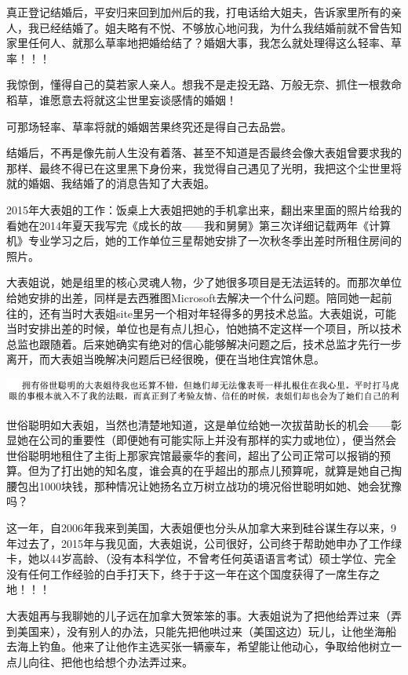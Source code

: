 \documentclass[9pt, b5paper]{article}
\begin{document}
真正登记结婚后，平安归来回到加州后的我，打电话给大姐夫，告诉家里所有的亲人，我已经结婚了。姐夫略有不悦、不够放心地问我，为什么我结婚前就不曾告知家里任何人、就那么草率地把婚给结了？婚姻大事，我怎么就处理得这么轻率、草率！！！

我惊倒，懂得自己的莫若家人亲人。想我不是走投无路、万般无奈、抓住一根救命稻草，谁愿意去将就这尘世里妄谈感情的婚姻！

可那场轻率、草率将就的婚姻苦果终究还是得自己去品尝。

结婚后，不再是像先前人生没有着落、甚至不知道是否最终会像大表姐曾要求我的那样、最终不得已在这里黑下身份来，我觉得自己遇见了光明，我把这个尘世里将就的婚姻、我结婚了的消息告知了大表姐。

2015年大表姐的工作：饭桌上大表姐把她的手机拿出来，翻出来里面的照片给我的看她在2014年夏天我写完《成长的故——我和舅舅》第三次详细记载两年《计算机》专业学习之后，她的工作单位三星帮她安排了一次秋冬季出差时所租住房间的照片。

大表姐说，她是组里的核心灵魂人物，少了她很多项目是无法运转的。而那次单位给她安排的出差，同样是去西雅图Microsoft去解决一个什么问题。陪同她一起前往的，还有当时大表姐site里另一个相对年轻得多的男技术总监。大表姐说，可能当时安排出差的时候，单位也是有点儿担心，怕她搞不定这样一个项目，所以技术总监也跟随着。后来她确实有绝对的信心能够解决问题之后，技术总监才先行一步离开，而大表姐当晚解决问题后已经很晚，便在当地住宾馆休息。

\begin{center}
\includegraphics[width=.9\linewidth]{./pic/backups_plans_20210427_184530.png}
\end{center}

世俗聪明如大表姐，当然也清楚地知道，这是单位给她一次拔苗助长的机会——彰显她在公司的重要性（即便她有可能实际上并没有那样的实力或地位），便当然会世俗聪明地租住了主街上那家宾馆最豪华的套间，超出了公司正常可以报销的预算。但为了打出她的知名度，谁会真的在乎超出的那点儿预算呢，就算是她自己掏腰包出1000块钱，那种情况让她扬名立万树立战功的境况俗世聪明如她、她会犹豫吗？

这一年，自2006年我来到美国，大表姐便也分头从加拿大来到硅谷谋生存以来，9年过去了，2015年与我见面，大表姐说，公司很好，公司终于帮助她申办了工作绿卡，她以44岁高龄、（没有本科学位，不曾考任何英语语言考试）硕士学位、完全没有任何工作经验的白手打天下，终于于这一年在这个国度获得了一席生存之地！！！

大表姐再与我聊她的儿子远在加拿大贺笨笨的事。大表姐说为了把他给弄过来（弄到美国来），没有别人的办法，只能先把他哄过来（美国这边）玩儿，让他坐海船去海上钓鱼。他来了让他作主选买张一辆豪车，希望能让他动心，争取给他树立一点儿向往、把他也给想个办法弄过来。 
\end{document}
